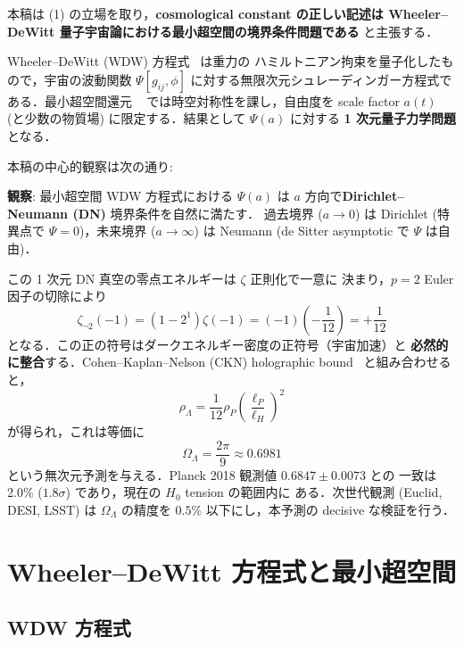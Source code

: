\documentclass[11pt,a4paper]{article}
\begin{document}
本稿は (1) の立場を取り，\textbf{cosmological constant の正しい記述は
Wheeler--DeWitt 量子宇宙論における最小超空間の境界条件問題である}
と主張する．

Wheeler--DeWitt (WDW) 方程式~\cite{DeWitt1967,Wheeler1968} は重力の
ハミルトニアン拘束を量子化したもので，宇宙の波動関数 $\Psi[g_{ij},\phi]$
に対する無限次元シュレーディンガー方程式である．最小超空間還元
~\cite{Misner1972} では時空対称性を課し，自由度を scale factor $a(t)$
(と少数の物質場) に限定する．結果として $\Psi(a)$ に対する
\textbf{1 次元量子力学問題}となる．

本稿の中心的観察は次の通り:

\begin{tcolorbox}[colback=yellow!10,colframe=orange!60!black]
\textbf{観察}: 最小超空間 WDW 方程式における $\Psi(a)$ は
$a$ 方向で\textbf{Dirichlet--Neumann (DN)} 境界条件を自然に満たす．
過去境界 ($a \to 0$) は Dirichlet (特異点で $\Psi = 0$)，未来境界
($a \to \infty$) は Neumann (de Sitter asymptotic で $\Psi$ は自由)．
\end{tcolorbox}

この 1 次元 DN 真空の零点エネルギーは $\zeta$ 正則化で一意に
決まり，$p=2$ Euler 因子の切除により
\begin{equation}
\zeta_{\neg 2}(-1) = (1 - 2^{1})\zeta(-1) = (-1)\left(-\frac{1}{12}\right)
= +\frac{1}{12}
\end{equation}
となる．この正の符号はダークエネルギー密度の正符号（宇宙加速）と
\textbf{必然的に整合}する．Cohen--Kaplan--Nelson (CKN) holographic
bound~\cite{CKN1999} と組み合わせると，
\begin{equation}
\rho_\Lambda = \frac{1}{12}\rho_P \left(\frac{\ell_P}{\ell_H}\right)^2
\end{equation}
が得られ，これは等価に
\begin{equation}
\boxed{\Omega_\Lambda = \frac{2\pi}{9} \approx 0.6981}
\end{equation}
という無次元予測を与える．Planck 2018 観測値 $0.6847 \pm 0.0073$ との
一致は 2.0\% ($1.8\sigma$) であり，現在の $H_0$ tension の範囲内に
ある．次世代観測 (Euclid, DESI, LSST) は $\Omega_\Lambda$ の精度を
$0.5\%$ 以下にし，本予測の decisive な検証を行う．

\section{Wheeler--DeWitt 方程式と最小超空間}

\subsection{WDW 方程式}
\end{document}
